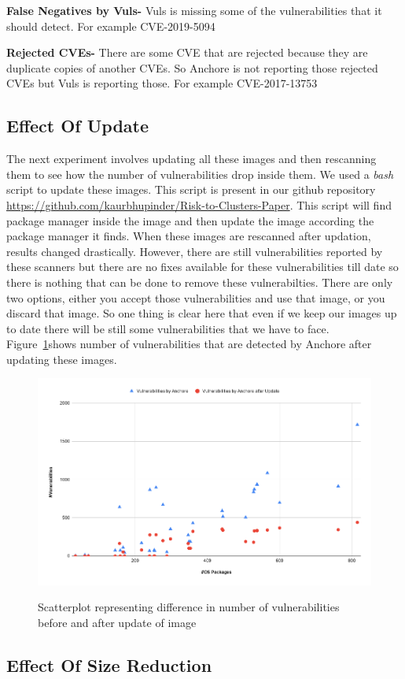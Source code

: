 \documentclass[a4paper,num-refs]{oup-contemporary}
\begin{document}
\textbf{False Negatives by Vuls-} Vuls is missing some of the vulnerabilities that it should detect. 
		For example CVE-2019-5094

\textbf{Rejected CVEs-} There are some CVE that are rejected because they are duplicate copies of another CVEs. 
	So Anchore is not reporting those rejected CVEs but Vuls is reporting those. For example CVE-2017-13753

\subsection{Effect Of Update}

The next experiment involves updating all these images and then rescanning them to see how the number of
vulnerabilities drop inside them. We used a \textit{bash} script to update these images. This script is
present in our github repository \href{https://github.com/kaurbhupinder/Risk-to-Clusters-Paper}
{https://github.com/kaurbhupinder/Risk-to-Clusters-Paper}. This script 
will find package manager inside the image and then update the image according the package manager it finds.
When these images are rescanned after updation, results changed drastically. However, there are still
vulnerabilities reported by these scanners but there are no fixes available for these vulnerabilities
till date so there is nothing that can be done to remove these vulnerabilties. There are only two
options, either you accept those vulnerabilities and use that image, or you discard that image.
So one thing is clear here that even if we keep our images up to date there will be still some
vulnerabilities that we have to face.
Figure~\ref{fig:graph2}shows number of vulnerabilities that are detected by Anchore after updating these images.

\begin{figure}[!htb]
        {\includegraphics[width=\columnwidth]
        {Figures/aferupdatewithpackage.png}}
        \caption{\label{fig:graph2} Scatterplot representing difference in number of vulnerabilities before and 
	after update of image}
      \end{figure}
\subsection{Effect Of Size Reduction}


\end{document}
